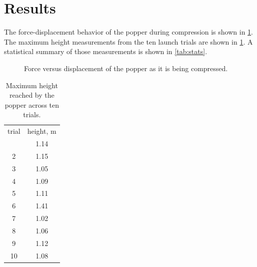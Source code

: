 \documentclass[amsmath,amssymb,aps,endfloats,linenumbers]{revtex4-2}
\begin{document}
\section{Results}
The force-displacement behavior of the popper during compression is shown in \cref{fig:force-displacement}. The maximum height measurements from the ten launch trials are shown in \cref{tab:height}. A statistical summary of those measurements is shown in \cref{tab:stats}.

\begin{figure}
\begin{center}

\end{center}
\caption{Force versus displacement of the popper as it is being compressed.}
\label{fig:force-displacement}
\end{figure}

\begin{table}
  \caption{Maximum height reached by the popper across ten trials.}
  \label{tab:height}
  \begin{center}
    \begin{ruledtabular}
      \begin{tabular}{cc}
        trial & height, \unit{\meter} \\
        \colrule
        1 & \num{1.14} \\
        2 & \num{1.15} \\
        3 & \num{1.05} \\
        4 & \num{1.09} \\
        5 & \num{1.11} \\
        6 & \num{1.41} \\
        7 & \num{1.02} \\
        8 & \num{1.06} \\
        9 & \num{1.12} \\
        10 & \num{1.08} \\
      \end{tabular}
    \end{ruledtabular}
  \end{center}
\end{table}
\end{document}
